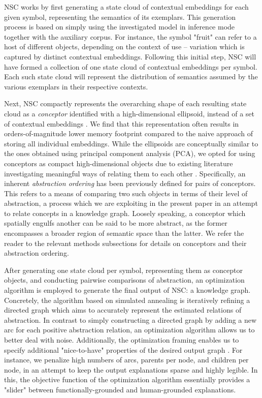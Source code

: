 NSC works by first generating a state cloud of contextual embeddings for each given symbol, representing the semantics of its exemplars. This generation process is based on simply using the investigated model in inference mode together with the auxiliary corpus. For instance, the symbol "fruit" can refer to a host of different objects, depending on the context of use -- variation which is captured by distinct contextual embeddings. Following this initial step, NSC will have formed a collection of one state cloud of contextual embeddings per symbol. Each such state cloud will represent the distribution of semantics assumed by the various exemplars in their respective contexts.

Next, NSC compactly represents the overarching shape of each resulting state cloud as a \textit{conceptor} identified with a high-dimensional ellipsoid, instead of a set of contextual embeddings \citep{jaeger_controlling_2017}. We find that this representation often results in orders-of-magnitude lower memory footprint compared to the naive approach of storing all individual embeddings. While the ellipsoids are conceptually similar to the ones obtained using principal component analysis (PCA), we opted for using conceptors as compact high-dimensional objects due to existing literature investigating meaningful ways of relating them to each other \citep{jaeger_controlling_2017}. Specifically, an inherent \textit{abstraction ordering} has been previously defined for pairs of conceptors. This refers to a means of comparing two such objects in terms of their level of abstraction, a process which we are exploiting in the present paper in an attempt to relate concepts in a knowledge graph. Loosely speaking, a conceptor which spatially engulfs another can be said to be more abstract, as the former encompasses a broader region of semantic space than the latter. We refer the reader to the relevant methods subsections for details on conceptors and their abstraction ordering.

After generating one state cloud per symbol, representing them as conceptor objects, and conducting pairwise comparisons of abstraction, an optimization algorithm is employed to generate the final output of NSC: a knowledge graph. Concretely, the algorithm based on simulated annealing is iteratively refining a directed graph which aims to accurately represent the estimated relations of abstraction. In contrast to simply constructing a directed graph by adding a new arc for each positive abstraction relation, an optimization algorithm allows us to better deal with noise. Additionally, the optimization framing enables us to specify additional "nice-to-have" properties of the desired output graph \citep{madsen_post-hoc_2021}. For instance, we penalize high numbers of arcs, parents per node, and children per node, in an attempt to keep the output explanations sparse and highly legible. In this, the objective function of the optimization algorithm essentially provides a "slider" between functionally-grounded and human-grounded explanations.

